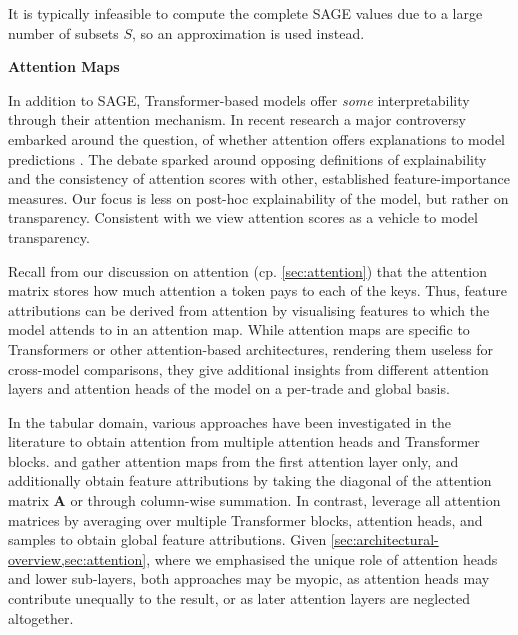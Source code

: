 It is typically infeasible to compute the complete \gls{SAGE} values due to a large number of subsets $S$, so an approximation is used instead.

\textbf{Attention Maps}

In addition to \gls{SAGE}, Transformer-based models offer \emph{some} interpretability through their attention mechanism. In recent research a major controversy embarked around the question, of whether attention offers explanations to model predictions \autocites[cp.][150]{bastingsElephantInterpretabilityRoom2020}[][5--7]{jainAttentionNotExplanation2019}[][9]{wiegreffeAttentionNotNot2019}. The debate sparked around opposing definitions of explainability and the consistency of attention scores with other, established feature-importance measures. Our focus is less on post-hoc explainability of the model, but rather on transparency. Consistent with \textcite[][8]{wiegreffeAttentionNotNot2019} we view attention scores as a vehicle to model transparency.

Recall from our discussion on attention (cp. \cref{sec:attention}) that the attention matrix stores how much attention a token pays to each of the keys. Thus, feature attributions can be derived from attention by visualising features to which the model attends to in an attention map. While attention maps are specific to Transformers or other attention-based architectures, rendering them useless for cross-model comparisons, they give additional insights from different attention layers and attention heads of the model on a per-trade and global basis.

In the tabular domain, various approaches have been investigated in the literature to obtain attention from multiple attention heads and Transformer blocks. \textcite[][18]{somepalliSaintImprovedNeural2021} and \textcite[][11]{borisovDeepNeuralNetworks2022} gather attention maps from the first attention layer only, and \textcite[][11]{borisovDeepNeuralNetworks2022} additionally obtain feature attributions by taking the diagonal of the attention matrix $\mathbf{A}$ or through column-wise summation. In contrast, \textcite[][10]{gorishniyRevisitingDeepLearning2021} leverage all attention matrices by averaging over multiple Transformer blocks, attention heads, and samples to obtain global feature attributions. Given \cref{sec:architectural-overview,sec:attention}, where we emphasised the unique role of attention heads and lower sub-layers, both approaches may be myopic, as attention heads may contribute unequally to the result, or as later attention layers are neglected altogether.

